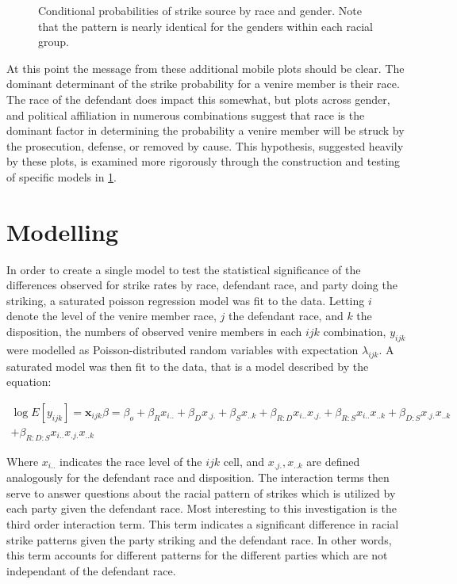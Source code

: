 \begin{figure}[h!]
  \centering
  \caption[Strike Source by Race and Gender (Sunshine)]
  {Conditional probabilities of strike source by race and gender. Note that the pattern is nearly identical for the genders within
    each racial group.} \label{fig:racegenpol}
\end{figure}

At this point the message from these additional mobile plots should be clear. The dominant determinant of the strike probability
for a venire member is their race. The race of the defendant does impact this somewhat, but plots across gender, and political
affiliation in numerous combinations suggest that race is the dominant factor in determining the probability a venire member will be
struck by the prosecution, defense, or removed by cause. This hypothesis, suggested heavily by these plots, is examined more
rigorously through the construction and testing of specific models in \ref{sec:mods}.

\section{Modelling} \label{sec:mods}

In order to create a single model to test the statistical significance of the differences observed for strike rates by race,
defendant race, and party doing the striking, a saturated poisson regression model was fit to the data. Letting $i$ denote the
level of the venire member race, $j$ the defendant race, and $k$ the disposition, the numbers of observed venire members in each
$ijk$ combination, $y_{ijk}$ were modelled as Poisson-distributed random variables with expectation $\lambda_{ijk}$. A saturated
model was then fit to the data, that is a model described by the equation:

\begin{multline}
  \log{E[y_{ijk}]} = \textbf{x}_{ijk}\beta = \beta_o + \beta_R x_{i..}  + \beta_{D} x_{.j.} + \beta_S x_{..k} +\beta_{R:D}x_{i..}
  x_{.j.} + \beta_{R:S} x_{i..} x_{..k} +\beta_{D:S} x_{.j.}x_{..k} \\+ \beta_{R:D:S} x_{i..} x_{.j.} x_{..k}
\end{multline}

Where $x_{i..}$ indicates the race level of the $ijk$ cell, and $x_{.j.},x_{..k}$ are defined analogously for the defendant race
and disposition. The interaction terms then serve to answer questions about the racial pattern of strikes which is utilized by
each party given the defendant race. Most interesting to this investigation is the third order interaction term. This term
indicates a significant difference in racial strike patterns given the party striking and the defendant race. In other words, this
term accounts for different patterns for the different parties which are not independant of the defendant race.

